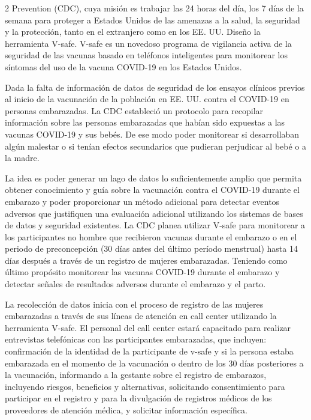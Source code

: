 \documentclass[12pt,spanish,Letterpaper,openany]{book}
\begin{document}
\begin {multicols}{2}
Prevention (CDC), cuya misión es trabajar las 24 horas del día, los 7 días de la semana para proteger a Estados
Unidos de las amenazas a la salud, la seguridad y la protección, tanto en el extranjero como en los EE. UU. Diseño
la herramienta V-safe. V-safe es un novedoso programa de vigilancia activa de la seguridad de las vacunas basado
en teléfonos inteligentes para monitorear los síntomas del uso de la vacuna COVID-19 en los Estados Unidos.

Dada la falta de información de datos de seguridad de los ensayos clínicos previos al inicio de la vacunación de la
población en EE. UU. contra el COVID-19 en personas embarazadas. La CDC estableció un protocolo para recopilar
información sobre las personas embarazadas que habían sido expuestas a las vacunas COVID-19 y sus bebés. De ese
modo poder monitorear si desarrollaban algún malestar o si tenían efectos secundarios que pudieran perjudicar al
bebé o a la madre.

La idea es poder generar un lago de datos lo suficientemente amplio que permita obtener conocimiento y guía sobre
la vacunación contra el COVID-19 durante el embarazo y poder proporcionar un método adicional para detectar
eventos adversos que justifiquen una evaluación adicional utilizando los sistemas de bases de datos y seguridad
existentes. La CDC planea utilizar V-safe para monitorear a los participantes no hombre que recibieron vacunas
durante el embarazo o en el periodo de preconcepción (30 días antes del último período menstrual) hasta 14 días
después a través de un registro de mujeres embarazadas. Teniendo como último propósito monitorear las vacunas
COVID-19 durante el embarazo y detectar señales de resultados adversos durante el embarazo y el parto.

La recolección de datos inicia con el proceso de registro de las mujeres embarazadas a través de sus líneas de atención
en call center utilizando la herramienta V-safe. El personal del call center estará capacitado para realizar entrevistas
telefónicas con las participantes embarazadas, que incluyen: confirmación de la identidad de la participante de v-safe y si la persona estaba embarazada en el momento de la vacunación o dentro de los 30 días posteriores a la
vacunación, informando a la gestante sobre el registro de embarazos, incluyendo riesgos, beneficios y alternativas,
solicitando consentimiento para participar en el registro y para la divulgación de registros médicos de los proveedores
de atención médica, y solicitar información específica.


\end{multicols}
\end{document}
